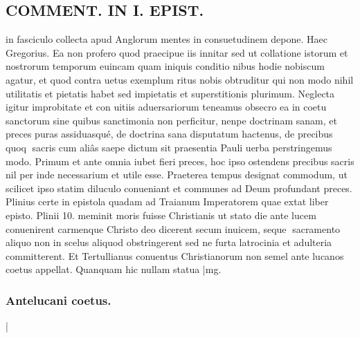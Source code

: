 \documentclass{article}
\begin{document}
\begin{pages}
\section*{COMMENT. IN I. EPIST. }\pstart in fasciculo collecta apud Anglorum mentes in consuetudinem depone. Haec Gregorius. Ea non profero quod praecipue iis innitar sed ut collatione istorum et nostrorum temporum euincam quam iniquis conditio nibus hodie nobiscum agatur, et quod contra uetus exemplum ritus nobis obtruditur qui non modo nihil utilitatis et pietatis habet sed impietatis et superstitionis plurimum. Neglecta igitur improbitate et con uitiis aduersariorum teneamus obsecro ea in coetu sanctorum sine quibus sanctimonia non perficitur, nenpe doctrinam sanam, et preces puras assiduasqué, de doctrina sana disputatum hactenus, de precibus quoq sacris cum aliâs saepe dictum sit praesentia Pauli uerba perstringemus modo. Primum et ante omnia iubet fieri preces, hoc ipso ostendens precibus sacris nil per inde necessarium et utile esse. Praeterea tempus designat commodum, ut scilicet ipso statim diluculo conueniant et communes ad Deum profundant preces. Plinius certe in epistola quadam ad Traianum Imperatorem quae extat liber  episto. Plinii 10. meminit moris fuisse Christianis ut stato die ante lucem conuenirent carmenque Christo deo dicerent secum inuicem, seque sacramento aliquo non in scelus aliquod obstringerent sed ne furta latrocinia et adulteria committerent. Et Tertullianus conuentus Christianorum non semel ante lucanos coetus appellat. Quanquam hic nullam statua\pend
|mg. \subsubsection*{Antelucani coetus. }|

\end{pages}
\end{document}
